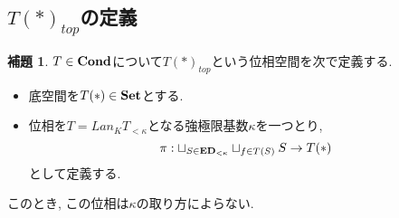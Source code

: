 \documentclass[dvipdfmx,a4paper,11pt]{article}
\theoremstyle{definition}
\newtheorem{lem}[thm]{補題}
\begin{document}
\subsection{$T(\ast)_{top}$の定義}
 \begin{tcolorbox}
 [colback = white, colframe = green!35!black, fonttitle = \bfseries,breakable = true]
\begin{lem} \cite{Sch19}
$T \in {\bf Cond}$について$T(\ast)_{top}$という位相空間を次で定義する.
\begin{itemize}
\item 底空間を$T(\ast) \in {\bf Set}$とする. 
\item 位相を$T = Lan_{K}T_{<\kappa}$となる強極限基数$\kappa$を一つとり, 
$$
\pi : \sqcup_{S \in {\bf ED}_{<\kappa}}  \sqcup_{f \in T(S) }  S \to T(\ast)
$$
として定義する.
\end{itemize}
このとき, この位相は$\kappa$の取り方によらない. 
\end{lem}
 \end{tcolorbox}
\end{document}
